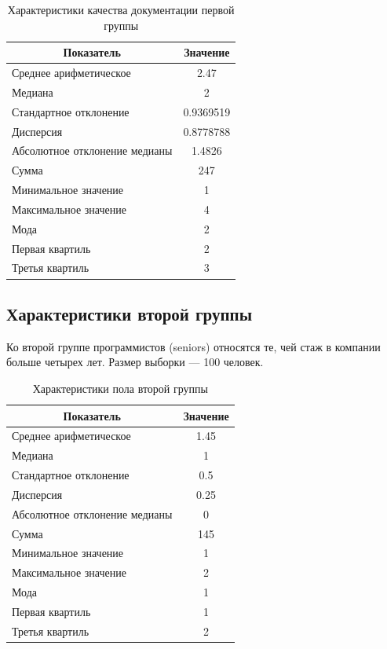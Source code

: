 \begin{table}[H]
	\centering
	\caption{Характеристики качества документации первой группы}
	\begin{tabular}{|l|c|}
		\hline
		\multicolumn{1}{|c|}{\textbf{Показатель}} & \textbf{Значение}\\ \hline
		Среднее арифметическое        & 2.47      \\ \hline
		Медиана                       & 2         \\ \hline
		Стандартное отклонение        & 0.9369519 \\ \hline
		Дисперсия                      & 0.8778788 \\ \hline
		Абсолютное отклонение медианы & 1.4826    \\ \hline
		Сумма                         & 247       \\ \hline
		Минимальное значение          & 1         \\ \hline
		Максимальное значение         & 4         \\ \hline
		Мода & 2 \\ \hline
		Первая квартиль & 2 \\ \hline
		Третья квартиль & 3 \\ \hline
	\end{tabular}
\end{table}






\subsection{Характеристики второй группы}
Ко второй группе программистов (seniors) относятся те, чей стаж в компании больше четырех лет. Размер выборки --- 100 человек.

\begin{table}[H]
	\centering
	\caption{Характеристики пола второй группы}
	\begin{tabular}{|l|c|}
		\hline
		\multicolumn{1}{|c|}{\textbf{Показатель}} & \textbf{Значение}\\ \hline
		Среднее арифметическое        & 1.45 \\ \hline
		Медиана                       & 1    \\ \hline
		Стандартное отклонение        & 0.5  \\ \hline
		Дисперсия                      & 0.25 \\ \hline
		Абсолютное отклонение медианы & 0    \\ \hline
		Сумма                         & 145  \\ \hline
		Минимальное значение          & 1    \\ \hline
		Максимальное значение         & 2    \\ \hline
		Мода & 1 \\ \hline
		Первая квартиль & 1 \\ \hline
		Третья квартиль & 2 \\ \hline
	\end{tabular}
\end{table}


